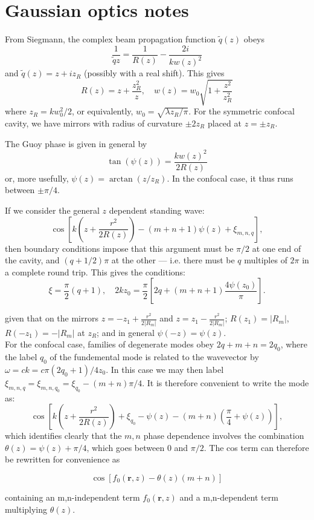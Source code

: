 \documentclass[a4paper,twocolumn,nobalancelastpage]{revtex4-1}
\newcommand{\vect}[1]{\mathbf{#1}}
\begin{document}
\section{Gaussian optics notes}
\label{sec:gaussian-optics}

From Siegmann, the complex beam propagation function $\tilde{q}(z)$
obeys
\begin{displaymath}
  \frac{1}{\tilde{q}{z}} = \frac{1}{R(z)} - \frac{2 i}{k w(z)^2}
\end{displaymath}
and $\tilde{q}(z) = z + i z_R$ (possibly with a real shift).  This gives
\begin{displaymath}
  R(z) = z + \frac{z_R^2}{z}, \quad
  w(z) = w_0 \sqrt{ 1 + \frac{z^2}{z_R^2}}
\end{displaymath}
where $z_R = k w_0^2/2$, or equivalently, $w_0 =\sqrt{\lambda
  z_R/\pi}$.  For the symmetric confocal cavity, we have mirrors with
radius of curvature $\pm 2 z_R$ placed at $z=\pm z_R$.  

The Guoy phase is given in general by 
\begin{displaymath}
  \tan(\psi(z)) = \frac{k w(z)^2}{2R(z)}
\end{displaymath}
or, more usefully, $\psi(z) = \arctan(z/z_R)$.  In the confocal
case, it thus runs between $\pm \pi/4$.

If we consider the general $z$ dependent standing wave:
\begin{displaymath}
  \cos\left[ k \left( z + \frac{r^2}{2R(z)} \right)
    - (m+n+1) \psi(z) + \xi_{m,n,q} \right],
\end{displaymath}
then boundary conditions impose that this argument must be $\pi/2$ at
one end of the cavity, and $(q+1/2) \pi$ at the other --- i.e. there
must be $q$ multiples of $2\pi$ in a complete round trip.  This gives
the conditions:
\begin{displaymath}
  \xi = \frac{\pi}{2}(q+1), \quad
  2kz_0 = \frac{\pi}{2} \left[ 2q + (m+n+1) \frac{4\psi(z_0)}{\pi} \right].
\end{displaymath}

given that on the mirrors $z=-z_1+\frac{r^2}{2|R_m|}$ and $z=z_1-\frac{r^2}{2|R_m|}$; $R(z_1)=|R_m|$,  $R(-z_1)=-|R_m|$ at $z_R$; and in general $\psi(-z)=\psi(z)$.\\
For the confocal case, families of degenerate modes obey
$2q + m + n = 2 q_0$, where the label $q_0$ of the fundemental
mode is related to the wavevector by
$\omega = c k = c\pi (2q_0 +1) / 4 z_0$.  In this case we may then label
$\xi_{m,n,q} = \xi_{m,n,q_0} = \xi_{q_0} - (m+n)\pi/4$.  It is therefore
convenient to write the mode as:
\begin{displaymath}
  \cos\left[ k \left( z + \frac{r^2}{2R(z)} \right)
    + \xi_{q_0} - \psi(z)
    - (m+n) \left( \frac{\pi}{4} + \psi(z) \right)
  \right],
\end{displaymath}
which identifies clearly that the $m,n$ phase dependence involves the
combination $\theta(z)=\psi(z) + \pi/4$, which goes between $0$ and $\pi/2$.
The cos term can therefore be rewritten for convenience as 

\begin{displaymath}
\label{eq:costermdivisible}
\cos[f_0(\vect{r},z)-\theta(z)(m+n)]
\end{displaymath}

containing an m,n-independent term $f_0(\vect{r},z)$ and a m,n-dependent term multiplying $\theta(z)$.
\end{document}
